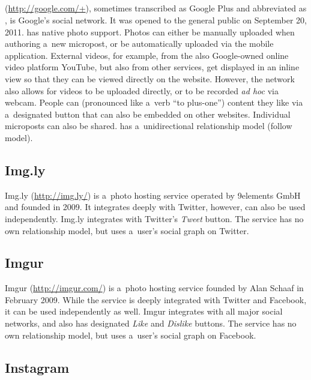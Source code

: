 \subsection{\googleplus}

\googleplus (\url{http://google.com/+}),
sometimes transcribed as Google Plus
and abbreviated as \gplus, is Google's social network.
It was opened to the general public on September 20, 2011.
\googleplus has native photo support.
Photos can either be manually uploaded
when authoring a~new micropost,
or be automatically uploaded via the \googleplus
mobile application.
External videos, for example, from
the also Google-owned online video platform YouTube,
but also from other services,
get displayed in an inline view
so that they can be viewed directly on the website.
However, the network also allows for
videos to be uploaded directly,
or to be recorded \emph{ad hoc} via webcam.
People can \emph{\plusone}
(pronounced like a~verb ``to plus-one'') content they like
via a~designated \plusone button
that can also be embedded on other websites.
Individual microposts can also be shared.
\googleplus has a~unidirectional relationship model
(follow model).

\subsection{Img.ly}

Img.ly (\url{http://img.ly/})
is a~photo hosting service operated by 9elements GmbH
and founded in 2009.
It integrates deeply with Twitter, however,
can also be used independently.
Img.ly integrates with Twitter's \emph{Tweet} button. 
The service has no own relationship model,
but uses a~user's social graph on Twitter.

\subsection{Imgur}

Imgur (\url{http://imgur.com/})
is a~photo hosting service
founded by Alan Schaaf in February 2009.
While the service is deeply integrated with Twitter
and Facebook, it can be used independently as well.
Imgur integrates with all major social networks,
and also has designated \emph{Like} and \emph{Dislike} buttons.
The service has no own relationship model,
but uses a~user's social graph on Facebook.

\subsection{Instagram}
\label{sec:instagram}

